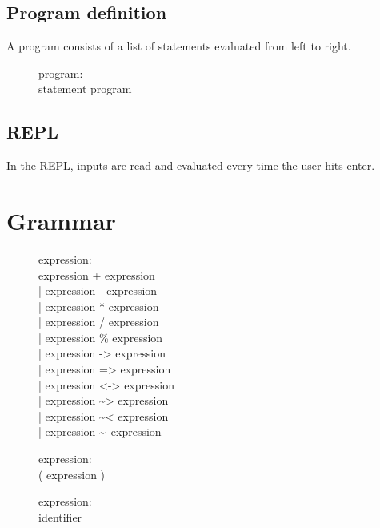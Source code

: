 \documentclass[12pt]{article}
\begin{document}
\subsection{Program definition}
A program consists of a list of statements evaluated from left to right.\\
\begin{description}
  \item[]program: \hfill \\
    statement program
\end{description}

\subsection{REPL}
In the REPL, inputs are read and evaluated every time the user hits enter.\\

\section{Grammar}
\begin{description}
  \item[]expression: \hfill \\
    expression + expression \\
    | expression - expression \\
    | expression * expression \\
    | expression / expression \\
    | expression \% expression \\
    | expression -> expression \\
    | expression => expression \\
    | expression <-> expression \\
    | expression \textasciitilde> expression \\
    | expression \textasciitilde< expression \\
    | expression \textasciitilde~expression \\
\end{description}

\begin{description}
  \item[]expression: \hfill \\
    ( expression )
\end{description}

\begin{description}
  \item[]expression: \hfill \\
    identifier
\end{description}
\end{document}

